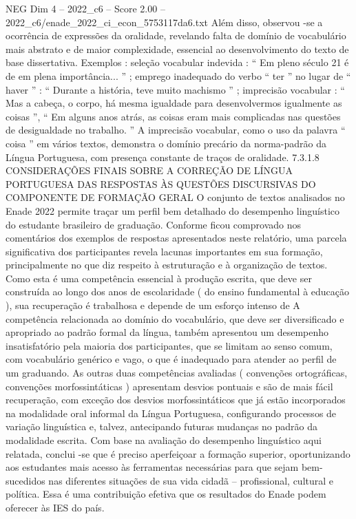 \begin{textsample}{NEG Dim 4 – 2022\_c6 – Score 2.00 – 2022\_c6/enade\_2022\_ci\_econ\_5753117da6.txt}
Além disso, observou -se a ocorrência de expressões da oralidade, revelando falta de domínio de vocabulário mais abstrato e de maior complexidade, essencial ao desenvolvimento do texto de base dissertativa.
Exemplos : seleção vocabular indevida : “ Em pleno século 21 é de em plena importância... ” ; emprego inadequado do verbo “ ter ” no lugar de “ haver ” : “ Durante a história, teve muito machismo ” ; imprecisão vocabular : “ Mas a cabeça, o corpo, há mesma igualdade para desenvolvermos igualmente as coisas ”, “ Em alguns anos atrás, as coisas eram mais complicadas nas questões de desigualdade no trabalho. ” A imprecisão vocabular, como o uso da palavra “ coisa ” em vários textos, demonstra o domínio precário da norma-padrão da Língua Portuguesa, com presença constante de traços de oralidade. 7.3.1.8 CONSIDERAÇÕES FINAIS SOBRE A CORREÇÃO DE LÍNGUA PORTUGUESA DAS RESPOSTAS ÀS QUESTÕES DISCURSIVAS DO COMPONENTE DE FORMAÇÃO GERAL O conjunto de textos analisados no Enade 2022 permite traçar um perfil bem detalhado do desempenho linguístico do estudante brasileiro de graduação.
Conforme ficou comprovado nos comentários dos exemplos de respostas apresentados neste relatório, uma parcela significativa dos participantes revela lacunas importantes em sua formação, principalmente no que diz respeito à estruturação e à organização de textos.
Como esta é uma competência essencial à produção escrita, que deve ser construída ao longo dos anos de escolaridade ( do ensino fundamental à educação ), sua recuperação é trabalhosa e depende de um esforço intenso de A competência relacionada ao domínio do vocabulário, que deve ser diversificado e apropriado ao padrão formal da língua, também apresentou um desempenho insatisfatório pela maioria dos participantes, que se limitam ao senso comum, com vocabulário genérico e vago, o que é inadequado para atender ao perfil de um graduando.
As outras duas competências avaliadas ( convenções ortográficas, convenções morfossintáticas ) apresentam desvios pontuais e são de mais fácil recuperação, com exceção dos desvios morfossintáticos que já estão incorporados na modalidade oral informal da Língua Portuguesa, configurando processos de variação linguística e, talvez, antecipando futuras mudanças no padrão da modalidade escrita.
Com base na avaliação do desempenho linguístico aqui relatada, conclui -se que é preciso aperfeiçoar a formação superior, oportunizando aos estudantes mais acesso às ferramentas necessárias para que sejam bem-sucedidos nas diferentes situações de sua vida cidadã – profissional, cultural e política.
Essa é uma contribuição efetiva que os resultados do Enade podem oferecer às IES do país.

\end{textsample}
